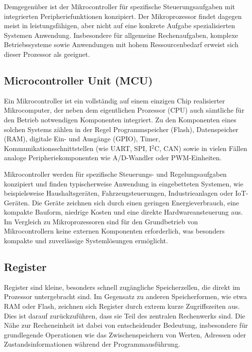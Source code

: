Demgegenüber ist der Mikrocontroller für spezifische Steuerungsaufgaben mit integrierten Peripheriefunktionen konzipiert. 
Der Mikroprozessor findet dagegen meist in leistungsfähigen, aber nicht auf eine konkrete Aufgabe spezialisierten Systemen Anwendung. 
Insbesondere für allgemeine Rechenaufgaben, komplexe Betriebssysteme sowie Anwendungen mit hohem Ressourcenbedarf erweist sich dieser Prozessor als geeignet.

\subsection*{Microcontroller Unit (MCU)}
Ein Mikrocontroller ist ein vollständig auf einem einzigen Chip realisierter Mikrocomputer, der neben dem eigentlichen Prozessor (CPU) auch sämtliche für den Betrieb notwendigen Komponenten integriert. 
Zu den Komponenten eines solchen Systems zählen in der Regel Programmspeicher (Flash), Datenspeicher (RAM), digitale Ein- und Ausgänge (GPIO), Timer, Kommunikationsschnittstellen (wie UART, SPI, I$^2$C, CAN) sowie in vielen Fällen analoge Peripheriekomponenten wie A/D-Wandler oder PWM-Einheiten.

Mikrocontroller werden für spezifische Steuerungs- und Regelungsaufgaben konzipiert und finden typischerweise Anwendung in eingebetteten Systemen, wie beispielsweise Haushaltsgeräten, Fahrzeugsteuerungen, Industrieanlagen oder IoT-Geräten. 
Die Geräte zeichnen sich durch einen geringen Energieverbrauch, eine kompakte Bauform, niedrige Kosten und eine direkte Hardwareansteuerung aus. 
Im Vergleich zu Mikroprozessoren sind für den Grundbetrieb von Mikrocontrollern keine externen Komponenten erforderlich, was besonders kompakte und zuverlässige Systemlösungen ermöglicht.


%


\subsection*{Register}
Register sind kleine, besonders schnell zugängliche Speicherzellen, die direkt im Prozessor untergebracht sind. 
Im Gegensatz zu anderen Speicherformen, wie etwa RAM oder Flash, zeichnen sich Register durch extrem kurze Zugriffszeiten aus. 
Dies ist darauf zurückzuführen, dass sie Teil des zentralen Rechenwerks sind. 
Die Nähe zur Recheneinheit ist dabei von entscheidender Bedeutung, insbesondere für grundlegende Operationen wie das Zwischenspeichern von Werten, Adressen oder Zustandsinformationen während der Programmausführung.

